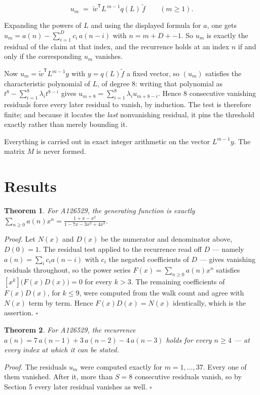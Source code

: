 \documentclass[11pt]{article}
\newtheorem{theorem}{Theorem}
\theoremstyle{definition}
\begin{document}
\[u_m \;=\; \tilde w^{\mathsf T} L^{\,m-1} q(L)\,\tilde f \qquad (m \ge 1).\]

Expanding the powers of $L$ and using the displayed formula for $a$, one gets $u_m = a(n) - \sum_{i=1}^{D} c_i\,a(n-i)$ with $n = m + D + -1$. So $u_m$ is exactly the residual of the claim at that index, and the recurrence holds at an index $n$ if and only if the corresponding $u_m$ vanishes.

Now $u_m = \tilde w^{\mathsf T} L^{m-1} y$ with $y = q(L)\tilde f$ a fixed vector, so $(u_m)$ satisfies the characteristic polynomial of $L$, of degree $8$: writing that polynomial as $t^{8} - \sum_{i=1}^{8} \lambda_i t^{8-i}$ gives $u_{m+8} = \sum_{i=1}^{8} \lambda_i u_{m+8-i}$. Hence $8$ consecutive vanishing residuals force every later residual to vanish, by induction. The test is therefore finite; and because it locates the {\itshape last} nonvanishing residual, it pins the threshold exactly rather than merely bounding it.

Everything is carried out in exact integer arithmetic on the vector $L^{m-1}y$. The matrix $M$ is never formed.

\section{Results}

\begin{theorem} For A126529, the generating function is exactly $\sum_{n\ge 0} a(n)x^n = \frac{1 + x - x^{2}}{1 - 7x - 3x^{2} + 4x^{3}}$.\end{theorem}

{\itshape Proof.} Let $N(x)$ and $D(x)$ be the numerator and denominator above, $D(0)=1$. The residual test applied to the recurrence read off $D$ --- namely $a(n) = \sum_i c_i a(n-i)$ with $c_i$ the negated coefficients of $D$ --- gives vanishing residuals throughout, so the power series $F(x)=\sum_{n\ge 0}a(n)x^n$ satisfies $[x^k]\bigl(F(x)D(x)\bigr) = 0$ for every $k > 3$. The remaining coefficients of $F(x)D(x)$, for $k \le 9$, were computed from the walk count and agree with $N(x)$ term by term. Hence $F(x)D(x) = N(x)$ identically, which is the assertion. $\square$

\begin{theorem} For A126529, the recurrence $a(n) = 7\,a(n-1) + 3\,a(n-2) - 4\,a(n-3)$ holds for every $n \ge 4$ --- at every index at which it can be stated.\end{theorem}

{\itshape Proof.} The residuals $u_m$ were computed exactly for $m = 1,\dots,37$. Every one of them vanished. After it, more than $S = 8$ consecutive residuals vanish, so by Section 5 every later residual vanishes as well. $\square$
\end{document}
